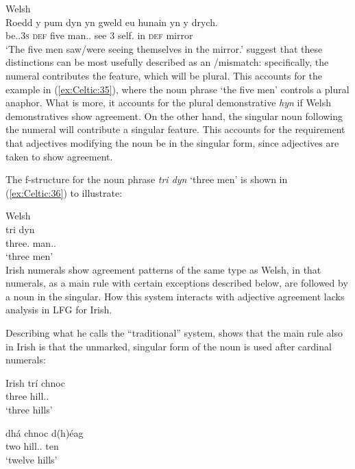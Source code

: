 \documentclass[output=paper,colorlinks,citecolor=brown]{langscibook}
\begin{document}
\ea\label{ex:Celtic:35} Welsh \citep[7]{MittSadl05}\\
\gll Roedd  y pum dyn  yn gweld eu hunain yn y drych.\\
be.\IPFV.3\textsc{s} \textsc{def} five {man.\M.\SG} {\PROG} see {3\PL}  {self.\PL} in \textsc{def} mirror\\
\glt`The five men saw/were seeing themselves in the mirror.'
\z
\citet{MittSadl05} suggest that these distinctions can be most usefully described as an \NINDEX/\CONCORD mismatch: specifically, the numeral contributes the \NINDEX \NUM feature, which will be plural. This accounts for the example in (\ref{ex:Celtic:35}), where the noun phrase `the five men' controls a plural anaphor. What is more, it accounts for the plural demonstrative \emph{hyn} if Welsh demonstratives show \NINDEX agreement. On the other hand, the singular noun following the numeral will contribute a singular \CONCORD \NUM feature. This accounts for the requirement that adjectives modifying the noun be in the singular form, since adjectives are taken to show \CONCORD agreement.

The f-structure for the noun phrase \emph{tri dyn} `three men' is shown in (\ref{ex:Celtic:36}) to illustrate:

\ea\label{ex:Celtic:36} Welsh \citep[11]{MittSadl05}\\
\gll tri  dyn\\
three.{\M} man.\M.{\SG}\\
\glt`three men'\\[1ex]
{}
\z 
Irish numerals show agreement patterns of the same type as Welsh, in that numerals, as a main rule with certain exceptions described below, are followed by a noun in the singular. How this system interacts with adjective agreement lacks analysis in LFG for Irish.

Describing what he calls the ``traditional'' system, \citet{OSiadhail1982} shows that the main rule also in Irish is that the unmarked, singular form of the noun is used after cardinal numerals:

\ea\label{ex:Celtic:37} Irish
\ea
\gll trí  chnoc\\
three hill.\M.{\SG}\\
\glt`three hills' \citep[99]{OSiadhail1982}

\ex
\gll dhá chnoc  d(h)\'eag\footnotemark\\
two {hill.\M.\SG} ten\\
\glt`twelve hills' \citep[100]{OSiadhail1982}
\end{document}
